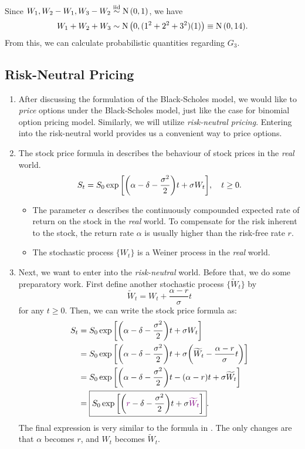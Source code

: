 \begin{enumerate}
\begin{enumerate}
Since \(W_1,W_2-W_1,W_3-W_2\overset{\mathrm{iid}}{\sim}\operatorname{N}\qty(0,1)\), we have
\[
W_1+W_2+W_3\sim\operatorname{N}\qty(0,(1^{2}+2^{2}+3^{2})(1))\equiv\operatorname{N}\qty(0,14).
\]
From this, we can calculate probabilistic quantities regarding \(G_3\).
\end{enumerate}
\end{enumerate}
\subsection{Risk-Neutral Pricing}
\begin{enumerate}
\item After discussing the formulation of the Black-Scholes model, we would
like to \emph{price} options under the Black-Scholes model, just like the case
for binomial option pricing model. Similarly, we will utilize
\emph{risk-neutral pricing}. Entering into the risk-neutral world provides us a
convenient way to price options.

\item The stock price formula in  describes
the behaviour of stock prices in the \emph{real} world.
\[
S_t=S_0\exp\qty[\qty(\alpha-\delta-\frac{\sigma^2}{2})t+\sigma W_t],\quad t\ge 0.
\]
\begin{itemize}
\item The parameter \(\alpha\) describes the continuously compounded expected
rate of return on the stock in the \emph{real} world. To compensate for the
risk inherent to the stock, the return rate \(\alpha\) is usually higher than
the risk-free rate \(r\).
\item The stochastic process \(\{W_t\}\) is a Weiner process in the \emph{real}
world.
\end{itemize}
\item \label{it:st-rn-expr}
Next, we want to enter into the \emph{risk-neutral} world. Before that,
we do some preparatory work. First define another stochastic process
\(\{\widetilde{W}_t\}\) by \[
 \widetilde{W}_t=W_t+\frac{\alpha-r}{\sigma}t
\]
for any \(t\ge 0\). Then, we can write the stock price formula as:
\begin{align*}
S_t&=S_0\exp\qty[\qty(\alpha-\delta-\frac{\sigma^2}{2})t+\sigma W_t] \\
&=S_0\exp\qty[\qty(\alpha-\delta-\frac{\sigma^2}{2})t+\sigma\qty(\widetilde{W}_t-\frac{\alpha-r}{\sigma}t)] \\
&=S_0\exp\qty[\qty(\alpha-\delta-\frac{\sigma^2}{2})t-(\alpha-r)t+\sigma\widetilde{W}_t] \\
&=\boxed{S_0\exp\qty[\qty({\color{violet}r}-\delta-\frac{\sigma^2}{2})t+\sigma{\color{violet}\widetilde{W}_t}]}.
\end{align*}
The final expression is very similar to the formula in .
The only changes are that \(\alpha\) becomes \(r\), and \(W_t\) becomes
\(\widetilde{W}_t\).


\end{enumerate}
